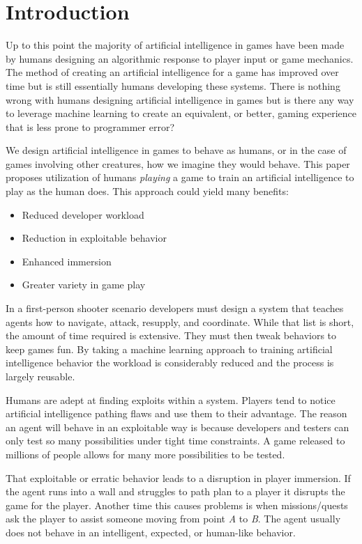 \documentclass[12pt]{thesis}
\begin{document}
\body


\chapter{Introduction}
Up to this point the majority of artificial intelligence in games have been 
made by humans designing an algorithmic response to player input or game 
mechanics\cite{NestedIF}. The method of creating an artificial intelligence for 
a game has improved over time\cite{AdvancedIF} but is still essentially humans 
developing these systems. There is nothing wrong with humans designing 
artificial intelligence in games but is there any way to leverage machine 
learning to create an equivalent, or better, gaming experience that is less 
prone to programmer error?

We design artificial intelligence in games to behave as humans, or in the case 
of games involving other creatures, how we imagine they would behave. This 
paper proposes utilization of humans \textit{playing} a game to train an 
artificial intelligence to play as the human does. This approach could yield 
many benefits:

\begin{itemize}
    \item Reduced developer workload
    \item Reduction in exploitable behavior
    \item Enhanced immersion
    \item Greater variety in game play
\end{itemize}

In a first-person shooter scenario developers must design a system that teaches 
agents how to navigate, attack, resupply, and coordinate. While that list is 
short, the amount of time required is extensive. They must then tweak behaviors 
to keep games fun\cite{Fairness}. By taking a machine learning approach to 
training artificial intelligence behavior the workload is considerably reduced 
and the process is largely reusable. 

Humans are adept at finding exploits within a system. Players tend to notice 
artificial intelligence pathing flaws and use them to their advantage. The 
reason an agent will behave in an exploitable way is because developers and 
testers can only test so many possibilities under tight time constraints. A 
game released to millions of people allows for many more possibilities to be 
tested. 

That exploitable or erratic behavior leads to a disruption in player immersion. 
If the agent runs into a wall and struggles to path plan to a player it 
disrupts the game for the player. Another time this causes problems is when 
missions/quests ask the player to assist someone moving from point \textit{A} 
to \textit{B}. The agent usually does not behave in an intelligent, expected, 
or human-like behavior. 
\end{document}
